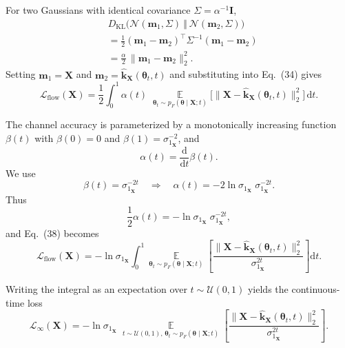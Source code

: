 \documentclass[journal,twoside,web]{ieeecolor}
\begin{document}
For two Gaussians with identical covariance $\Sigma = \alpha^{-1}\mathbf{I}$,
\begin{equation}
\begin{aligned}
& D_{\mathrm{KL}}\big(
\mathcal{N}(\mathbf{m}_1,\Sigma)\ \Vert\ \mathcal{N}(\mathbf{m}_2,\Sigma)
\big)\\
& =
\frac{1}{2}(\mathbf{m}_1-\mathbf{m}_2)^\top \Sigma^{-1} (\mathbf{m}_1-\mathbf{m}_2) \\
& =
\frac{\alpha}{2}\,\|\mathbf{m}_1-\mathbf{m}_2\|_2^2.
\end{aligned}
\end{equation}
Setting $\mathbf{m}_1=\mathbf{X}$ and $\mathbf{m}_2=\hat{\mathbf{k}}_{\mathbf{X}}(\boldsymbol{\theta}_t,t)$
and substituting into Eq.~(34) gives
\begin{equation}
\mathcal{L}_{\text{flow}}(\mathbf{X})
=
\frac{1}{2}
\int_0^1
\alpha(t)\;
\mathop{\mathbb{E}}\limits_{\boldsymbol{\theta}_t \sim p_F(\boldsymbol{\theta}\mid \mathbf{X};t)}
\big[
\|\mathbf{X}-\hat{\mathbf{k}}_{\mathbf{X}}(\boldsymbol{\theta}_t,t)\|_2^2
\big]\,\mathrm{d}t.
\label{eq:cts-flow-alpha}
\end{equation}

The channel accuracy is parameterized by a monotonically increasing function $\beta(t)$ with
$\beta(0)=0$ and $\beta(1)=\sigma_{1_\mathbf{X}}^{-2}$, and
\begin{equation}
\alpha(t) = \frac{\mathrm{d}}{\mathrm{d}t}\beta(t).
\end{equation}
We use
\begin{equation}
\beta(t) = \sigma_{1_\mathbf{X}}^{-2t}
\quad\Rightarrow\quad
\alpha(t)
=
- 2 \ln \sigma_{1_\mathbf{X}} \;\sigma_{1_\mathbf{X}}^{-2t}.
\end{equation}
Thus
\begin{equation}
\frac{1}{2}\alpha(t)
=
- \ln \sigma_{1_\mathbf{X}} \;\sigma_{1_\mathbf{X}}^{-2t},
\end{equation}
and Eq.~(38) becomes
\begin{equation}
\mathcal{L}_{\text{flow}}(\mathbf{X}) = 
- \ln \sigma_{1_\mathbf{X}}
\int_0^1
\mathop{\mathbb{E}}\limits_{\boldsymbol{\theta}_t \sim p_F(\boldsymbol{\theta}\mid \mathbf{X};t)}
\left[
    \frac{\big\| \mathbf{X} - \hat{\mathbf{k}}_{\mathbf{X}}(\boldsymbol{\theta}_t,t) \big\|_2^2}
         {\sigma_{1_\mathbf{X}}^{2t}}
\right]\mathrm{d}t.
\end{equation}



Writing the integral as an expectation over $t \sim \mathcal{U}(0,1)$ yields the continuous-time loss
\begin{equation}
\mathcal{L}_{\infty}(\mathbf{X}) = 
- \ln \sigma_{1_\mathbf{X}}\;
\mathop{\mathbb{E}}\limits_{t\sim\mathcal{U}(0,1),\,
           \boldsymbol{\theta}_t \sim p_F(\boldsymbol{\theta}\mid \mathbf{X};t)}
\left[
\frac{\|\mathbf{X}-\hat{\mathbf{k}}_{\mathbf{X}}(\boldsymbol{\theta}_t,t)\|_2^2}
     {\sigma_{1_\mathbf{X}}^{2t}}
\right].
\end{equation}
\end{document}
